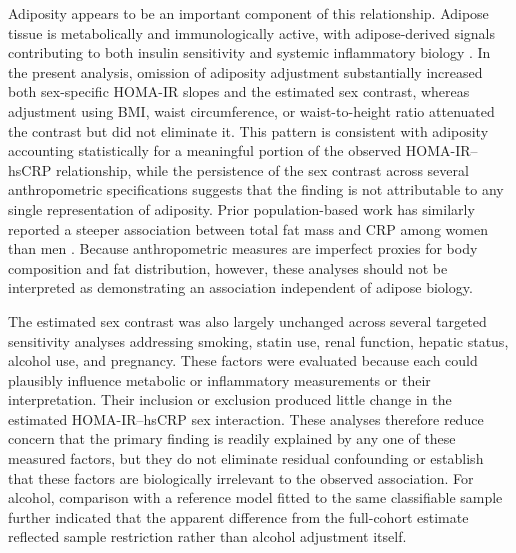 \documentclass[11pt]{article}
\begin{document}
Adiposity appears to be an important component of this relationship. Adipose
tissue is metabolically and immunologically active, with adipose-derived
signals contributing to both insulin sensitivity and systemic inflammatory
biology \citep{Ouchi2011Adipokines}. In the present analysis, omission of
adiposity adjustment substantially increased both sex-specific HOMA-IR
slopes and the estimated sex contrast, whereas adjustment using BMI, waist
circumference, or waist-to-height ratio attenuated the contrast but did not
eliminate it. This pattern is consistent with adiposity accounting
statistically for a meaningful portion of the observed HOMA-IR--hsCRP
relationship, while the persistence of the sex contrast across several
anthropometric specifications suggests that the finding is not attributable
to any single representation of adiposity. Prior population-based work has
similarly reported a steeper association between total fat mass and CRP
among women than men \citep{Khera2009SexCRPBodyFat}. Because anthropometric
measures are imperfect proxies for body composition and fat distribution,
however, these analyses should not be interpreted as demonstrating an
association independent of adipose biology.

The estimated sex contrast was also largely unchanged across several
targeted sensitivity analyses addressing smoking, statin use, renal
function, hepatic status, alcohol use, and pregnancy. These factors were
evaluated because each could plausibly influence metabolic or inflammatory
measurements or their interpretation. Their inclusion or exclusion produced
little change in the estimated HOMA-IR--hsCRP sex interaction. These analyses
therefore reduce concern that the primary finding is readily explained by
any one of these measured factors, but they do not eliminate residual
confounding or establish that these factors are biologically irrelevant to
the observed association. For alcohol, comparison with a reference model
fitted to the same classifiable sample further indicated that the apparent
difference from the full-cohort estimate reflected sample restriction rather
than alcohol adjustment itself.
\end{document}
